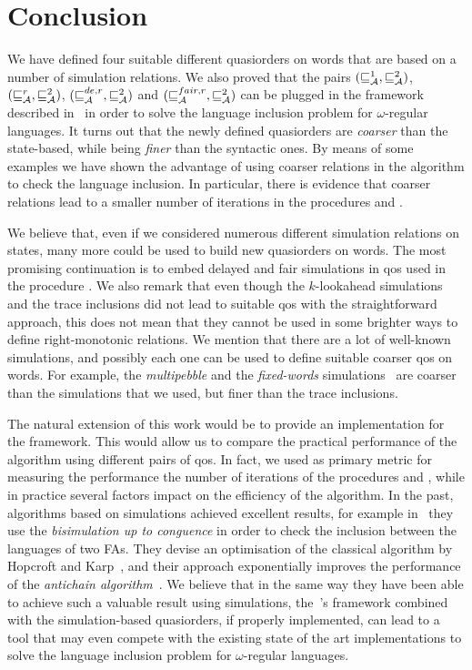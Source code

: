 \chapter{Conclusion}
\label{chap:conclusion}

We have defined four suitable different quasiorders on words that are based on a number
of simulation relations.
We also proved that the pairs $(\sqsubseteq^1_{\mathcal{A}}, \sqsubseteq_{\mathcal{A}}^{2})$, $(\sqsubseteq_{\mathcal{A}}^r, \sqsubseteq_{\mathcal{A}}^{2})$,
$(\sqsubseteq_{\mathcal{A}}^{de,r}, \sqsubseteq_{\mathcal{A}}^{2})$ and $(\sqsubseteq_{\mathcal{A}}^{fair,r}, \sqsubseteq_{\mathcal{A}}^{2})$ can be plugged in the
framework described in~\cite{ganty2020omegalang} in order to solve
the language inclusion problem for $\omega$-regular languages.
It turns out that the newly defined quasiorders are \emph{coarser} than the state-based,
while being \emph{finer} than the syntactic ones.
By means of some examples we have shown the advantage of using
coarser relations in the algorithm to check the language inclusion.
In particular, there is evidence that coarser relations lead to a smaller
number of iterations in the procedures  and .

We believe that, even if we considered numerous different simulation relations
on states, many more could be used to build new quasiorders on words.
The most promising continuation is to embed delayed and fair simulations
in qos used in the procedure .
We also remark that even though the $k$-lookahead simulations and the trace inclusions
did not lead to suitable qos with the straightforward approach,
this does not mean that they cannot be used in some brighter ways to define
right-monotonic relations.
We mention that there are a lot of well-known simulations, and possibly
each one can be used to define suitable coarser qos on words.
For example, the \emph{multipebble} and the \emph{fixed-words}
simulations~\cite{clemente2017efficient} are
coarser than the simulations that we used, but finer than the trace inclusions.

The natural extension of this work would be to provide an implementation
for the framework.
This would allow us to compare the practical performance of the algorithm
using different pairs of qos.
In fact, we used as primary metric for measuring the performance the number of
iterations of the procedures  and ,
while in practice several factors impact on the efficiency of the algorithm.
In the past, algorithms based on simulations achieved excellent results,
for example in~\cite{bonchi2013checking} they use the
\emph{bisimulation up to conguence} in order to check the inclusion between
the languages of two FAs.
They devise an optimisation of the classical algorithm by Hopcroft and Karp~\cite{hopcroft1973n},
and their approach exponentially improves the performance of the
\emph{antichain algorithm}~\cite{de2006antichains}.
We believe that in the same way they have been able to achieve such a valuable
result using simulations, the~\cite{ganty2020omegalang}'s framework combined with the
simulation-based quasiorders, if properly implemented, can lead
to a tool that may even compete with the existing state of the art
implementations to solve the language inclusion problem for $\omega$-regular languages.
